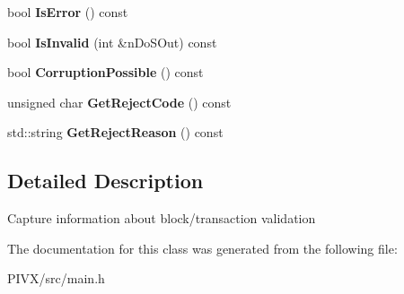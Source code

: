 \begin{DoxyCompactItemize}
bool {\bfseries Is\+Error} () const
\item 
\mbox{\label{class_c_validation_state_a37ddca2d02e6cd6394e04040148edb12}} 
bool {\bfseries Is\+Invalid} (int \&n\+Do\+S\+Out) const
\item 
\mbox{\label{class_c_validation_state_add2b2dc505a8527fda32295b65bb636b}} 
bool {\bfseries Corruption\+Possible} () const
\item 
\mbox{\label{class_c_validation_state_ad90959549444c9795484785d8af97850}} 
unsigned char {\bfseries Get\+Reject\+Code} () const
\item 
\mbox{\label{class_c_validation_state_a8fa9612cb40c3c8592f7cd29b5931ccd}} 
std\+::string {\bfseries Get\+Reject\+Reason} () const
\end{DoxyCompactItemize}


\subsection{Detailed Description}
Capture information about block/transaction validation 

The documentation for this class was generated from the following file\+:\begin{DoxyCompactItemize}
\item 
P\+I\+V\+X/src/main.\+h\end{DoxyCompactItemize}
